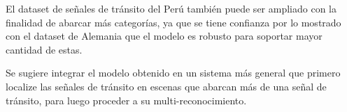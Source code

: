 	El dataset de señales de tránsito del Perú también puede ser ampliado con la finalidad de abarcar más categorías, ya que se tiene confianza por lo mostrado con el dataset de Alemania que el modelo es robusto para soportar mayor cantidad de estas.
	
	Se sugiere integrar el modelo obtenido en un sistema más general que primero localize las señales de tránsito en escenas que abarcan más de una señal de tránsito, para luego proceder a su multi-reconocimiento.

\newpage